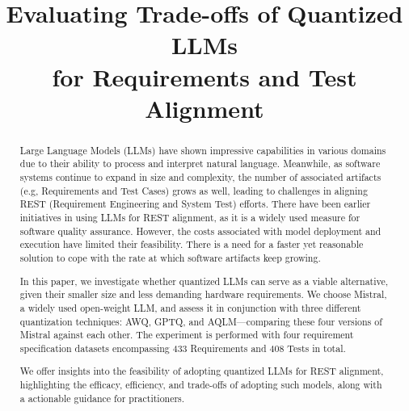 \documentclass[conference]{IEEEtran}
\begin{document}
\title{Evaluating Trade-offs of Quantized LLMs\\for Requirements and Test Alignment}

\author{
    \and
    \and
}

\maketitle

\begin{abstract}

Large Language Models (LLMs) have shown impressive capabilities in various domains due to their ability to process and interpret natural language. Meanwhile, as software systems continue to expand in size and complexity, the number of associated artifacts (e.g, Requirements and Test Cases) grows as well, leading to challenges in aligning REST (Requirement Engineering and System Test) efforts. There have been earlier initiatives in using LLMs for REST alignment, as it is a widely used measure for software quality assurance. However, the costs associated with model deployment and execution have limited their feasibility. There is a need for a faster yet reasonable solution to cope with the rate at which software artifacts keep growing.

In this paper, we investigate whether quantized LLMs can serve as a viable alternative, given their smaller size and less demanding hardware requirements. We choose Mistral, a widely used open-weight LLM, and assess it in conjunction with three different quantization techniques: AWQ, GPTQ, and AQLM---comparing these four versions of Mistral against each other.
The experiment is performed with four requirement specification datasets encompassing 433 Requirements and 408 Tests in total.

We offer insights into the feasibility of adopting quantized LLMs for 
REST alignment, highlighting the efficacy, efficiency, and trade-offs of adopting such models, along with a actionable guidance for practitioners.

\end{abstract}
\end{document}
